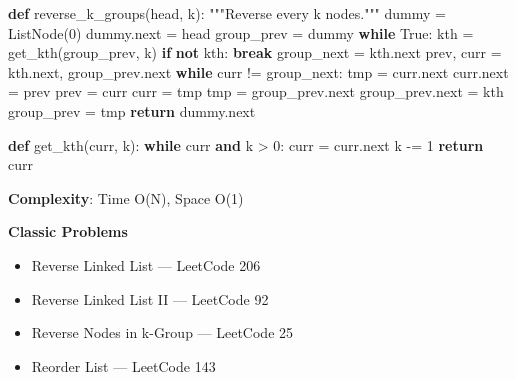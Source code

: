 \documentclass[11pt]{article}
\providecommand{\tightlist}{\setlength{\itemsep}{1pt}\setlength{\parskip}{0pt}}
\newenvironment{Shaded}{\begin{snugshade}}{\end{snugshade}}
\newcommand{\BuiltInTok}[1]{\textcolor[rgb]{0.50,0.55,0.55}{#1}}
\newcommand{\CommentTok}[1]{\textcolor[rgb]{0.48,0.49,0.49}{#1}}
\newcommand{\ControlFlowTok}[1]{\textcolor[rgb]{0.99,0.74,0.29}{\textbf{#1}}}
\newcommand{\DecValTok}[1]{\textcolor[rgb]{0.96,0.45,0.00}{#1}}
\newcommand{\KeywordTok}[1]{\textcolor[rgb]{0.81,0.81,0.76}{\textbf{#1}}}
\newcommand{\NormalTok}[1]{\textcolor[rgb]{0.81,0.81,0.76}{#1}}
\newcommand{\OperatorTok}[1]{\textcolor[rgb]{0.81,0.81,0.76}{#1}}
\newcommand{\VariableTok}[1]{\textcolor[rgb]{0.15,0.68,0.68}{#1}}
\begin{document}
\begin{Shaded}
\begin{Highlighting}[]
\KeywordTok{def}\NormalTok{ reverse\_k\_groups(head, k):}
    \CommentTok{"""Reverse every k nodes."""}
\NormalTok{    dummy }\OperatorTok{=}\NormalTok{ ListNode(}\DecValTok{0}\NormalTok{)}
\NormalTok{    dummy.}\BuiltInTok{next} \OperatorTok{=}\NormalTok{ head}
\NormalTok{    group\_prev }\OperatorTok{=}\NormalTok{ dummy}
    \ControlFlowTok{while} \VariableTok{True}\NormalTok{:}
\NormalTok{        kth }\OperatorTok{=}\NormalTok{ get\_kth(group\_prev, k)}
        \ControlFlowTok{if} \KeywordTok{not}\NormalTok{ kth:}
            \ControlFlowTok{break}
\NormalTok{        group\_next }\OperatorTok{=}\NormalTok{ kth.}\BuiltInTok{next}
\NormalTok{        prev, curr }\OperatorTok{=}\NormalTok{ kth.}\BuiltInTok{next}\NormalTok{, group\_prev.}\BuiltInTok{next}
        \ControlFlowTok{while}\NormalTok{ curr }\OperatorTok{!=}\NormalTok{ group\_next:}
\NormalTok{            tmp }\OperatorTok{=}\NormalTok{ curr.}\BuiltInTok{next}
\NormalTok{            curr.}\BuiltInTok{next} \OperatorTok{=}\NormalTok{ prev}
\NormalTok{            prev }\OperatorTok{=}\NormalTok{ curr}
\NormalTok{            curr }\OperatorTok{=}\NormalTok{ tmp}
\NormalTok{        tmp }\OperatorTok{=}\NormalTok{ group\_prev.}\BuiltInTok{next}
\NormalTok{        group\_prev.}\BuiltInTok{next} \OperatorTok{=}\NormalTok{ kth}
\NormalTok{        group\_prev }\OperatorTok{=}\NormalTok{ tmp}
    \ControlFlowTok{return}\NormalTok{ dummy.}\BuiltInTok{next}

\KeywordTok{def}\NormalTok{ get\_kth(curr, k):}
    \ControlFlowTok{while}\NormalTok{ curr }\KeywordTok{and}\NormalTok{ k }\OperatorTok{\textgreater{}} \DecValTok{0}\NormalTok{:}
\NormalTok{        curr }\OperatorTok{=}\NormalTok{ curr.}\BuiltInTok{next}
\NormalTok{        k }\OperatorTok{{-}=} \DecValTok{1}
    \ControlFlowTok{return}\NormalTok{ curr}
\end{Highlighting}
\end{Shaded}

\textbf{Complexity}: Time O(N), Space O(1)

\textbf{Classic Problems}

\begin{itemize}
\tightlist
\item
  Reverse Linked List --- LeetCode 206
\item
  Reverse Linked List II --- LeetCode 92
\item
  Reverse Nodes in k-Group --- LeetCode 25
\item
  Reorder List --- LeetCode 143
\end{itemize}
\end{document}
